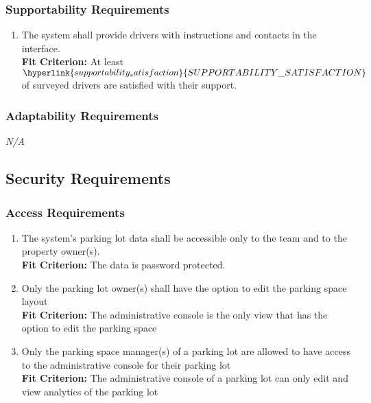 \documentclass[12pt,letterpaper]{article}
\begin{document}
\subsubsection{Supportability Requirements}
\begin{enumerate}[resume*] 
    \item The system shall provide drivers with instructions and contacts in the interface.\\
    \textbf{Fit Criterion:} At least $\hyperlink{supportability_satisfaction}{SUPPORTABILITY\_SATISFACTION}$ of surveyed drivers are satisfied with their support.
\end{enumerate}

\subsubsection{Adaptability Requirements}
\noindent \emph{N/A}

\subsection{Security Requirements}
\subsubsection{Access Requirements}
\begin{enumerate}[{SR}1.] 
    \item The system's parking lot data shall be accessible only to the team and to the property owner(s).\label{pocnf5} \\
    \textbf{Fit Criterion:} The data is password protected.
    \item Only the parking lot owner(s) shall have the option to edit the parking space layout \label{asr2} \\
    \textbf{Fit Criterion:} The administrative console is the only view that has the option to edit the parking space
    \item Only the parking space manager(s) of a parking lot are allowed to have access to the administrative console for their parking lot \label{asr3}\\
    \textbf{Fit Criterion:} The administrative console of a parking lot can only edit and view analytics of the parking lot
\end{enumerate}
\end{document}

